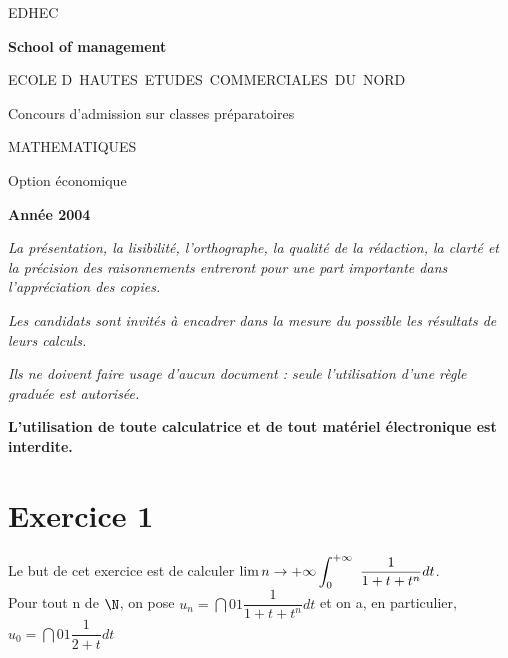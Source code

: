 \documentclass[11pt]{article}%
\begin{document}
\begin{center}
{\Huge EDHEC}

\textbf{School of management\vspace{3cm}}

{\large ECOLE D\E\ HAUTES\ ETUDES\ COMMERCIALES\ DU\ NORD}

{\large Concours d'admission sur classes préparatoires}

\underline{\hspace{3cm}}

{\LARGE MATHEMATIQUES}

{\large Option économique}

\textbf{Année 2004}{\large }
\end{center}

\noindent \textsl{La présentation, la lisibilité, l'orthographe, la
qualité
de la rédaction, la clarté et la précision des raisonnements entreront
pour
une part importante dans l'appréciation des copies.}

\noindent \textsl{Les candidats sont invités à encadrer dans la mesure
du
possible les résultats de leurs calculs.}

\noindent \textsl{Ils ne doivent faire usage d'aucun document : seule
l'utilisation d'une règle graduée est autorisée.\vspace{1cm}}

\noindent \textbf{L'utilisation de toute calculatrice et de tout
matériel électronique est interdite.}\vspace{1cm}

\section*{Exercice 1}

Le but de cet exercice est de calculer $\lim{n\rightarrow + \infty
}\displaystyle \int_{0}^{+ \infty }\ \dfrac{1}{1 + t + t^{n}}dt$. \\
Pour tout n de $\N$, on pose $u_{n} = \dint{0}{1}\dfrac{1}{
1 + t + t^{n}}dt$ et on a, en particulier, $u_{0} =
\dint{0}{1}\dfrac{1}{
2 + t}dt$
\end{document}
